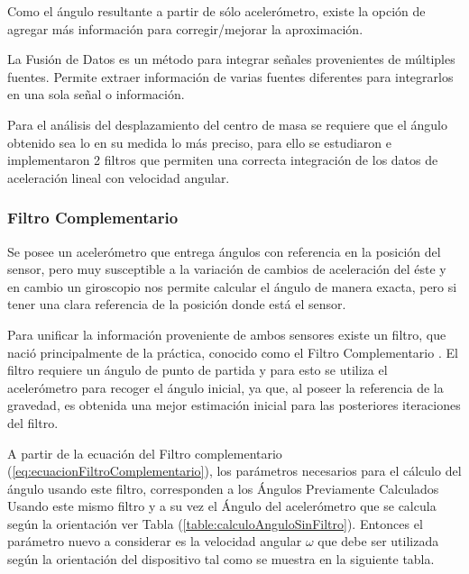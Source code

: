 \documentclass[12pt,a4paper]{article}
\begin{document}
Como el ángulo resultante a partir de sólo acelerómetro, existe la opción de agregar más información para corregir/mejorar la aproximación.

La Fusión de Datos es un método para integrar señales provenientes de múltiples fuentes. Permite extraer información de varias fuentes diferentes para integrarlos en una sola señal o información.

Para el análisis del desplazamiento del centro de masa se requiere que el ángulo obtenido sea lo en su medida lo más preciso, para ello se estudiaron e implementaron 2 filtros que permiten una correcta integración de los datos de aceleración lineal con velocidad angular.

\subsubsection{Filtro Complementario}
Se posee un acelerómetro que entrega ángulos con referencia en la posición del sensor, pero muy susceptible a la variación de cambios de aceleración del éste y en cambio un giroscopio nos permite calcular el ángulo de manera exacta, pero si tener una clara referencia de la posición donde está el sensor. 

Para unificar la información proveniente de ambos sensores existe un filtro, que nació principalmente de la práctica, conocido como el Filtro Complementario \cite{TesisUSM}.
El filtro requiere un ángulo de punto de partida y para esto se utiliza el acelerómetro para recoger el ángulo inicial, ya que, al poseer la referencia de la gravedad, es obtenida una mejor estimación inicial para las posteriores iteraciones del filtro.


A partir de la ecuación del Filtro complementario (\ref{eq:ecuacionFiltroComplementario}), los parámetros necesarios para el cálculo del ángulo usando este filtro, corresponden a los Ángulos Previamente Calculados Usando este mismo filtro y a su vez el Ángulo del acelerómetro que se calcula según la orientación ver Tabla (\ref{table:calculoAnguloSinFiltro}).
Entonces el parámetro nuevo a considerar es la velocidad angular $\omega$ que debe ser utilizada según la orientación del dispositivo tal como se muestra en la siguiente tabla.
\end{document}
